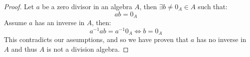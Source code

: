 \begin{proof}
	Let $a$ be a zero divisor in an algebra $A$, then $\exists b \neq 0_A \in A$ such that:
	\[ab = 0_A\]
	Assume $a$ has an inverse in $A$, then:
	\[a^{-1}ab = a^{-1}0_A \Leftrightarrow b = 0_A\]
	This contradicts our assumptions, and so we have proven that $a$ has no inverse in $A$ and thus $A$ is not a division algebra.
\end{proof}
